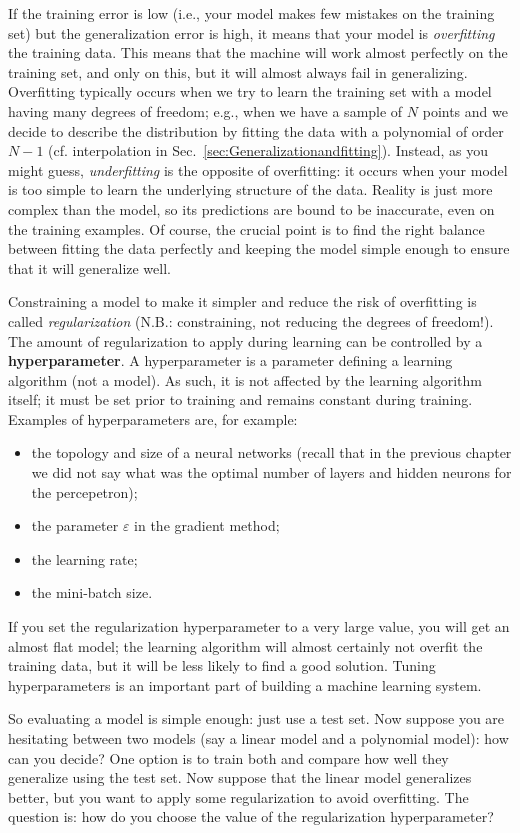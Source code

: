 If the training error is low (i.e., your model makes few mistakes on the training set) but the generalization error is high, it means that your model is \emph{overfitting} the training data. This means that the machine will work almost perfectly on the training set, and only on this, but it will almost always fail in generalizing. Overfitting typically occurs when we try to learn the training set with a model having many degrees of freedom; e.g., when we have a sample of $N$ points and we decide to describe the distribution by fitting the data with a polynomial of order $N-1$ (cf. interpolation in Sec.~\ref{sec:Generalizationandfitting}).
Instead, as you might guess, \emph{underfitting} is the opposite of overfitting: it occurs when your model is too simple to learn the underlying structure of the data. Reality is just more complex than the model, so its predictions are bound to be inaccurate, even on the training examples.
Of course, the crucial point is to find the right balance between fitting the data perfectly and keeping the model simple enough to ensure that it will generalize well.

Constraining a model to make it simpler and reduce the risk of overfitting is called \emph{regularization} (N.B.: constraining, not reducing the degrees of freedom!). The amount of regularization to apply during learning can be controlled by a \textbf{hyperparameter}. A hyperparameter is a parameter defining a learning algorithm (not a model). As such, it is not affected by the learning algorithm itself; it must be set prior to training and remains constant during training. Examples of hyperparameters are, for example:
\begin{itemize}
\item the topology and size of a neural networks (recall that in the previous chapter we did not say what was the optimal number of layers and hidden neurons for the percepetron);
\item the parameter $\varepsilon$ in the gradient method;
\item the learning rate;
\item the mini-batch size.
\end{itemize}
If you set the regularization hyperparameter to a very large value, you will get an almost flat model; the learning algorithm will almost certainly not overfit the training data, but it will be less likely to find a good solution. Tuning hyperparameters is an important part of building a machine learning system.

So evaluating a model is simple enough: just use a test set. Now suppose you are hesitating between two models (say a linear model and a polynomial model): how can you decide? One option is to train both and compare how well they generalize using the test set. Now suppose that the linear model generalizes better, but you want to apply some regularization to avoid overfitting. The question is: how do you choose the value of the regularization hyperparameter?

